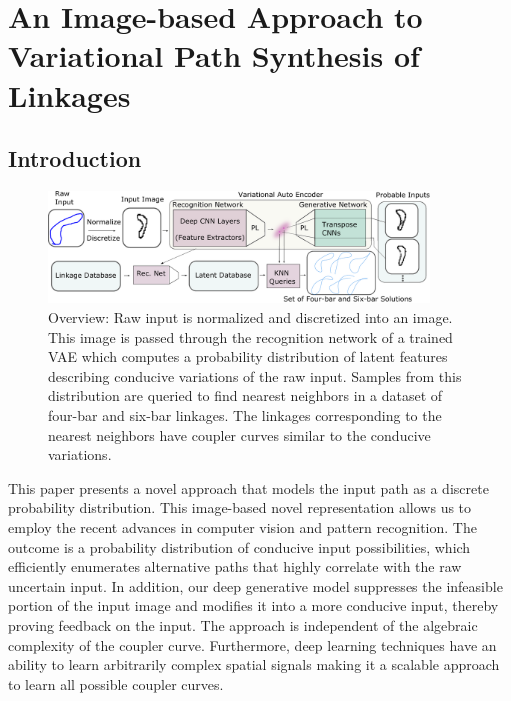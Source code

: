 \chapter{An Image-based Approach to Variational Path Synthesis of Linkages}\label{image_based_approach}

\section{Introduction}

\begin{figure}[tbh]
\centering
\includegraphics[width=0.9\textwidth]{idetc-20/figure/fig_overview.eps}
  \caption{Overview: Raw input is normalized and discretized into an image. This image is passed through the recognition network of a trained VAE which computes a probability distribution of latent features describing conducive variations of the raw input. Samples from this distribution are queried to find nearest neighbors in a dataset of four-bar and six-bar linkages. The linkages corresponding to the nearest neighbors have coupler curves similar to the conducive variations.}
\label{fig_contrasting_overview}
\end{figure}

This paper presents a novel approach that models the input path as a discrete probability distribution. This image-based novel representation allows us to employ the recent advances in computer vision and pattern recognition. The outcome is a probability distribution of conducive input possibilities, which efficiently enumerates alternative paths that highly correlate with the raw uncertain input. In addition, our deep generative model suppresses the infeasible portion of the input image and modifies it into a more conducive input, thereby proving feedback on the input. The approach is independent of the algebraic complexity of the coupler curve. Furthermore, deep learning techniques have an ability to learn arbitrarily complex spatial signals making it a scalable approach to learn all possible coupler curves.

